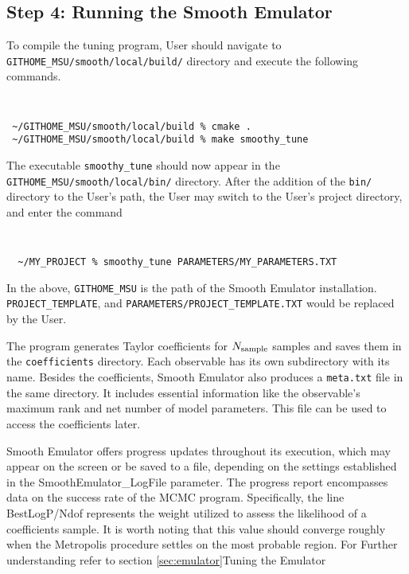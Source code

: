 \documentclass[main.tex]{subfiles}
\begin{document}
\subsection{Step 4: Running the Smooth Emulator}
To compile the tuning program, User should navigate to {\tt GITHOME\_MSU/smooth/local/build/} directory and execute the following commands.
{\tt
\begin{verbatim}
 ~/GITHOME_MSU/smooth/local/build % cmake .
 ~/GITHOME_MSU/smooth/local/build % make smoothy_tune
\end{verbatim}
}
The executable {\tt smoothy\_tune} should now appear in the {\tt GITHOME\_MSU/smooth/local/bin/} directory. After the addition of the {\tt bin/} directory to the User's path, the User may switch to the User's project directory, and enter the command
{\tt
\begin{verbatim}
  ~/MY_PROJECT % smoothy_tune PARAMETERS/MY_PARAMETERS.TXT
\end{verbatim}
}
In the above, {\tt GITHOME\_MSU} is the path of the Smooth Emulator installation. {\tt PROJECT\_TEMPLATE}, and {\tt PARAMETERS/PROJECT\_TEMPLATE.TXT} would be replaced by the User.

The program generates Taylor coefficients for $N_{\rm sample}$ samples and saves them in the {\tt coefficients} directory. Each observable has its own subdirectory with its name. Besides the coefficients, Smooth Emulator also produces a {\tt meta.txt} file in the same directory. It includes essential information like the observable's maximum rank and net number of model parameters. This file can be used to access the coefficients later.

Smooth Emulator offers progress updates throughout its execution, which may appear on the screen or be saved to a file, depending on the settings established in the SmoothEmulator\_LogFile parameter. The progress report encompasses data on the success rate of the MCMC program. Specifically, the line BestLogP/Ndof represents the weight utilized to assess the likelihood of a coefficients sample. It is worth noting that this value should converge roughly when the Metropolis procedure settles on the most probable region. For Further understanding refer to section \ref{sec:emulator}{Tuning the Emulator}
\end{document}
